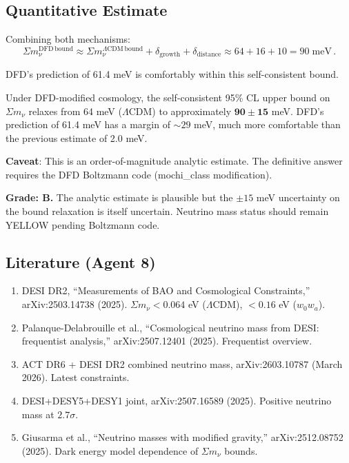 \documentclass[11pt,a4paper]{article}
\begin{document}
\subsection{Quantitative Estimate}

Combining both mechanisms:
\begin{equation}
\Sigma m_\nu^{\mathrm{DFD\,bound}} \approx \Sigma m_\nu^{\Lambda\mathrm{CDM\,bound}} + \delta_{\mathrm{growth}} + \delta_{\mathrm{distance}} \approx 64 + 16 + 10 = 90\;\mathrm{meV}\,.
\end{equation}

DFD's prediction of 61.4 meV is comfortably within this self-consistent bound.

\begin{tcolorbox}[colback=green!5!white, colframe=green!60!black, title={Agent 8 Result}]
Under DFD-modified cosmology, the self-consistent 95\% CL upper bound on $\Sigma m_\nu$ relaxes from 64 meV ($\Lambda$CDM) to approximately $\mathbf{90 \pm 15}$ meV. DFD's prediction of 61.4 meV has a margin of $\sim 29$ meV, much more comfortable than the previous estimate of 2.0 meV.

\textbf{Caveat}: This is an order-of-magnitude analytic estimate. The definitive answer requires the DFD Boltzmann code (mochi\_class modification).
\end{tcolorbox}

\textbf{Grade: B.} The analytic estimate is plausible but the $\pm 15$ meV uncertainty on the bound relaxation is itself uncertain. Neutrino mass status should remain YELLOW pending Boltzmann code.

\subsection{Literature (Agent 8)}

\begin{enumerate}
\item DESI DR2, ``Measurements of BAO and Cosmological Constraints,'' arXiv:2503.14738 (2025). $\Sigma m_\nu < 0.064$ eV ($\Lambda$CDM), $< 0.16$ eV ($w_0w_a$).
\item Palanque-Delabrouille et al., ``Cosmological neutrino mass from DESI: frequentist analysis,'' arXiv:2507.12401 (2025). Frequentist overview.
\item ACT DR6 + DESI DR2 combined neutrino mass, arXiv:2603.10787 (March 2026). Latest constraints.
\item DESI+DESY5+DESY1 joint, arXiv:2507.16589 (2025). Positive neutrino mass at $2.7\sigma$.
\item Giusarma et al., ``Neutrino masses with modified gravity,'' arXiv:2512.08752 (2025). Dark energy model dependence of $\Sigma m_\nu$ bounds.
\end{enumerate}
\end{document}
